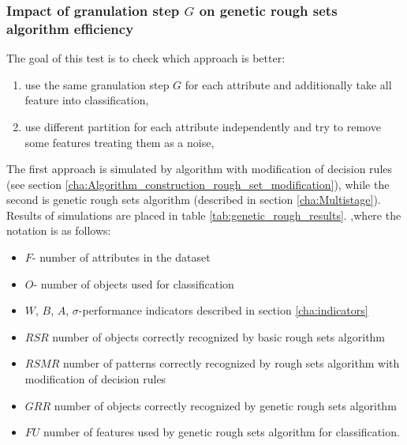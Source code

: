 \subsubsection{Impact of granulation step $G$ on genetic rough sets algorithm efficiency}
\label{cha:Simulation_reaearch_4}
The goal of this test is to check which approach is better:
\begin{enumerate}
    \item use the same granulation step $G$ for each attribute and additionally
        take all feature into classification,
    \item use different partition for each attribute independently and try to
        remove some features treating them as a noise,
\end{enumerate}
The first approach is simulated by algorithm with modification of decision
rules (see section \ref{cha:Algorithm_construction_rough_set_modification}), 
while the second is genetic rough sets algorithm (described in section
\ref{cha:Multistage}). Results of simulations are placed in table \ref{tab:genetic_rough_results}.
,where the notation is as follows:
\begin{itemize}
    \item $F$- number of attributes in the dataset
    \item $O$- number of objects used for classification
    \item $W$, $B$, $A$, $\sigma$-performance indicators described in section \ref{cha:indicators}
    \item $RSR$ number of objects correctly recognized by basic rough sets
        algorithm
    \item $RSMR$ number of patterns correctly recognized by rough sets
        algorithm with modification of decision rules
    \item $GRR$ number of objects correctly recognized by genetic rough sets
        algorithm
    \item $FU$ number of features used by genetic rough sets algorithm for
        classification.
\end{itemize}

